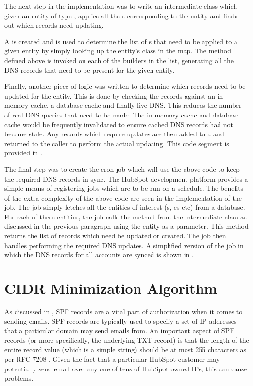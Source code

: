 The next step in the implementation was to write an intermediate class which given an entity of type , applies all the s corresponding to the entity and finds out which records need updating. 

A  is created and is used to determine the list of s that need to be applied to a given entity by simply looking up the entity's class in the map. The  method defined above is invoked on each of the builders in the list, generating all the DNS records that need to be present for the given entity. 

Finally, another piece of logic was written to determine which records need to be updated for the entity. This is done by checking the records against an in-memory cache, a database cache and finally live DNS. This reduces the number of real DNS queries that need to be made. The in-memory cache and database cache would be frequently invalidated to ensure cached DNS records had not become stale. Any records which require updates are then added to a  and returned to the caller to perform the actual updating. This code segment is provided in  .

The final step was to create the cron job which will use the above code to keep the required DNS records in sync. The HubSpot development platform provides a simple means of registering jobs which are to be run on a schedule. The benefits of the extra complexity of the above code are seen in the implementation of the job. The job simply fetches all the entities of interest (s, es etc) from a database. For each of these entities, the job calls the method from the intermediate class as discussed in the previous paragraph using the entity as a parameter. This method returns the list of records which need be updated or created. The job then handles performing the required DNS updates. A simplified version of the job in which the DNS records for all accounts are synced is shown in  .

\break
\section{CIDR Minimization Algorithm}
As discussed in , SPF records are a vital part of authorization when it comes to sending emails. SPF records are typically used to specify a set of IP addresses that a particular domain may send emails from. An important aspect of SPF records (or more specifically, the underlying TXT record) is that the length of the entire record value (which is a simple string) should be at most 255 characters as per RFC 7208 \cite{spfRFC}. Given the fact that a particular HubSpot customer may potentially send email over any one of tens of HubSpot owned IPs, this can cause problems. 

